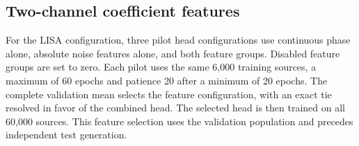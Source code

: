 \documentclass[10pt,prd,aps,a4paper,twocolumn,superscriptaddress,nofootinbib,floatfix]{revtex4-2}
\begin{document}
\subsection{Two-channel coefficient features}
For the LISA configuration, three pilot head configurations use continuous phase alone, absolute noise features alone, and both feature groups. Disabled feature groups are set to zero. Each pilot uses the same 6,000 training sources, a maximum of 60 epochs and patience 20 after a minimum of 20 epochs. The complete validation mean selects the feature configuration, with an exact tie resolved in favor of the combined head. The selected head is then trained on all 60,000 sources. This feature selection uses the validation population and precedes independent test generation.


\end{document}

